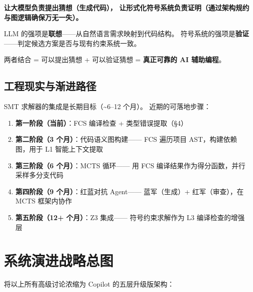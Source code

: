 \documentclass[10pt, openany]{book}
\begin{document}
\begin{principle}[神经符号分工]
    \textbf{让大模型负责提出猜想（生成代码），
    让形式化符号系统负责证明（通过架构规约与图逻辑确保万无一失）。}
    
    LLM 的强项是\textbf{联想}——从自然语言需求映射到代码结构。
    符号系统的强项是\textbf{验证}——判定候选方案是否与现有约束系统一致。
    
    两者结合 = 可以提出猜想 + 可以验证猜想 =
    \textbf{真正可靠的 AI 辅助编程}。
\end{principle}

\subsection{工程现实与渐进路径}

SMT 求解器的集成是长期目标（\textasciitilde 6--12 个月）。
近期的可落地步骤：

\begin{enumerate}
    \item \textbf{第一阶段（当前）}：FCS 编译检查 + 类型错误提取（§4）
    \item \textbf{第二阶段（3 个月）}：代码语义图构建——
        FCS 遍历项目 AST，构建依赖图，用于 L1 智能上下文提取
    \item \textbf{第三阶段（6 个月）}：MCTS 循环——
        用 FCS 编译结果作为得分函数，并行采样多分支代码
    \item \textbf{第四阶段（9 个月）}：红蓝对抗 Agent——
        蓝军（生成）+ 红军（审查），在 MCTS 框架内协作
    \item \textbf{第五阶段（12+ 个月）}：Z3 集成——
        符号约束求解作为 L3 编译检查的增强层
\end{enumerate}

\section{系统演进战略总图}

将以上所有高级讨论浓缩为 Copilot 的五层升级版架构：
\end{document}

